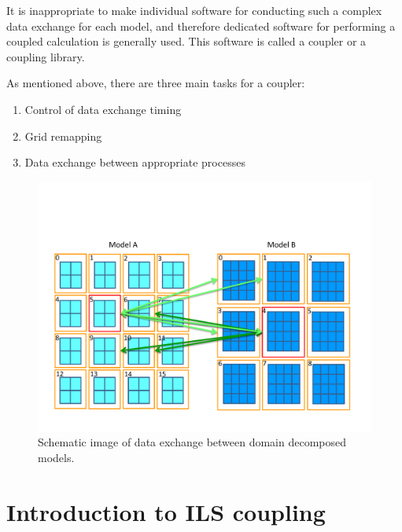 \documentclass[11pt,a4paper]{report}
\begin{document}
It is inappropriate to make individual software for conducting such a complex data exchange for each model, and therefore dedicated software for performing a coupled calculation is generally used.
This software is called a coupler or a coupling library.

As mentioned above, there are three main tasks for a coupler:
\begin{enumerate}
\item{Control of data exchange timing}
\item{Grid remapping}
\item{Data exchange between appropriate processes}
\end{enumerate}


\begin{figure}[H]
\begin{center}
\includegraphics[bb = 0 30 700 450, scale=0.6, clip]{figs/data_exchange_example.pdf}
\caption{Schematic image of data exchange between domain decomposed models.}
\label{fig:data_exchange_example}
\end{center}
\end{figure}


\chapter{Introduction to ILS coupling}
\end{document}
